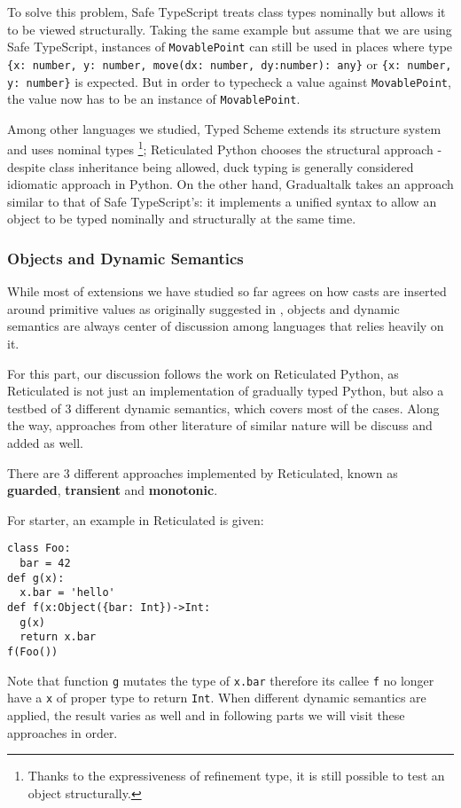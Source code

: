 To solve this problem, Safe TypeScript treats class types nominally but allows it to be viewed structurally.
Taking the same example but assume that we are using Safe TypeScript,
instances of \texttt{MovablePoint} can still be used in places where type
\texttt{\{x: number, y: number, move(dx: number, dy:number): any\}}
or \texttt{\{x: number, y: number\}} is expected.
But in order to typecheck a value against \texttt{MovablePoint},
the value now has to be an instance of \texttt{MovablePoint}.

Among other languages we studied,
Typed Scheme extends its structure system and uses nominal types \footnote{Thanks to the expressiveness of refinement type, it is still possible to test an object structurally.};
Reticulated Python chooses the structural approach - despite class inheritance being allowed,
duck typing is generally considered idiomatic approach in Python.
On the other hand, Gradualtalk takes an approach similar to that of Safe TypeScript's:
it implements a unified syntax to allow an object to be typed nominally and structurally at the same time.

\subsubsection{Objects and Dynamic Semantics}

While most of extensions we have studied so far agrees on how casts are inserted
around primitive values as originally suggested in \cite{siek2006gradual},
objects and dynamic semantics are always center of discussion among languages
that relies heavily on it.

For this part, our discussion follows the work on Reticulated Python,
as Reticulated is not just an implementation of gradually typed Python,
but also a testbed of 3 different dynamic semantics, which covers most of the cases.
Along the way, approaches from other literature of similar nature will be discuss and added as well.

There are 3 different approaches implemented by Reticulated, known as \textbf{guarded}, \textbf{transient}
and \textbf{monotonic}.

For starter, an example in Reticulated is given:

\begin{verbatim}
class Foo:
  bar = 42
def g(x):
  x.bar = 'hello'
def f(x:Object({bar: Int})->Int:
  g(x)
  return x.bar
f(Foo())
\end{verbatim}

Note that function \texttt{g} mutates the type of \texttt{x.bar} therefore its callee \texttt{f}
no longer have a \texttt{x} of proper type to return \texttt{Int}.
When different dynamic semantics are applied, the result varies as well and in following parts
we will visit these approaches in order.

